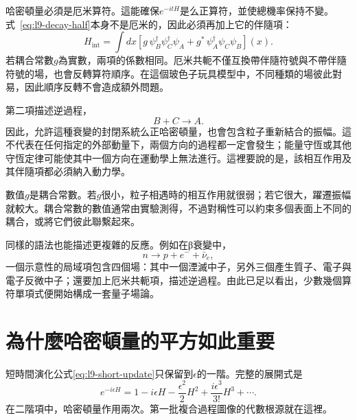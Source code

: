 哈密頓量必須是厄米算符。這能確保\(e^{-itH}\)是么正算符，並使總機率保持不變。式~\eqref{eq:l9-decay-half}本身不是厄米的，因此必須再加上它的伴隨項：
\begin{equation}
H_{\mathrm{int}}
=\int dx\left[
g\,\psi_B^\dagger\psi_C^\dagger\psi_A
+g^*\,\psi_A^\dagger\psi_C\psi_B
\right](x).
\label{eq:l9-hermitian-vertex}
\end{equation}
若耦合常數\(g\)為實數，兩項的係數相同。厄米共軛不僅互換帶伴隨符號與不帶伴隨符號的場，也會反轉算符順序。在這個玻色子玩具模型中，不同種類的場彼此對易，因此順序反轉不會造成額外問題。

第二項描述逆過程，
\begin{equation}
B+C\longrightarrow A.
\end{equation}
因此，允許這種衰變的封閉系統么正哈密頓量，也會包含粒子重新結合的振幅。這不代表在任何指定的外部動量下，兩個方向的過程都一定會發生；能量守恆或其他守恆定律可能使其中一個方向在運動學上無法進行。這裡要說的是，該相互作用及其伴隨項都必須納入動力學。

\begin{classroomqa}
\end{classroomqa}

數值\(g\)是耦合常數。若\(g\)很小，粒子相遇時的相互作用就很弱；若它很大，躍遷振幅就較大。耦合常數的數值通常由實驗測得，不過對稱性可以約束多個表面上不同的耦合，或將它們彼此聯繫起來。

同樣的語法也能描述更複雜的反應。例如在{\proseunicodefont β}衰變中，
\begin{equation}
n\longrightarrow p+e^-+\bar\nu_e,
\end{equation}
一個示意性的局域項包含四個場：其中一個湮滅中子，另外三個產生質子、電子與電子反微中子；還要加上厄米共軛項，描述逆過程。由此已足以看出，少數幾個算符單項式便開始構成一套量子場論。

\section{為什麼哈密頓量的平方如此重要}

短時間演化公式\eqref{eq:l9-short-update}只保留到\(\epsilon\)的一階。完整的展開式是
\begin{equation}
e^{-i\epsilon H}
=1-i\epsilon H-\frac{\epsilon^2}{2}H^2
+\frac{i\epsilon^3}{3!}H^3+\cdots.
\label{eq:l9-exponential}
\end{equation}
在二階項中，哈密頓量作用兩次。第一批複合過程圖像的代數根源就在這裡。

